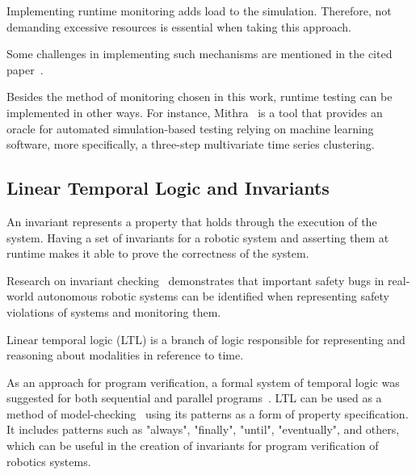 Implementing runtime monitoring adds load to the simulation. Therefore, not demanding excessive resources is essential when taking this approach.

Some challenges in implementing such mechanisms are mentioned in the cited paper~\cite{stadler2022towards}. 

Besides the method of monitoring chosen in this work, runtime testing can be implemented in other ways. For instance, Mithra~\cite{AfzalMithra} is a tool that provides an oracle for automated simulation-based testing relying on machine learning software, more specifically, a three-step multivariate time series clustering. 


\subsection{Linear Temporal Logic and Invariants}
\label{ssec:ltlinvariants}

An invariant represents a property that holds through the execution of the system. Having a set of invariants for a robotic system and asserting them at runtime makes it able to prove the correctness of the system.

Research on invariant checking~\cite{zizyte2021importance} demonstrates that important safety bugs in real-world autonomous robotic systems can be identified when representing safety violations of systems and monitoring them.

Linear temporal logic (LTL) is a branch of logic responsible for representing and reasoning about modalities in reference to time. 

As an approach for program verification, a formal system of temporal logic was suggested for both sequential and parallel programs~\cite{pnueli1977temporal}. LTL can be used as a method of model-checking~\cite{dwyer1998property} using its patterns as a form of property specification. It includes patterns such as "always", "finally", "until", "eventually", and others, which can be useful in the creation of invariants for program verification of robotics systems.


